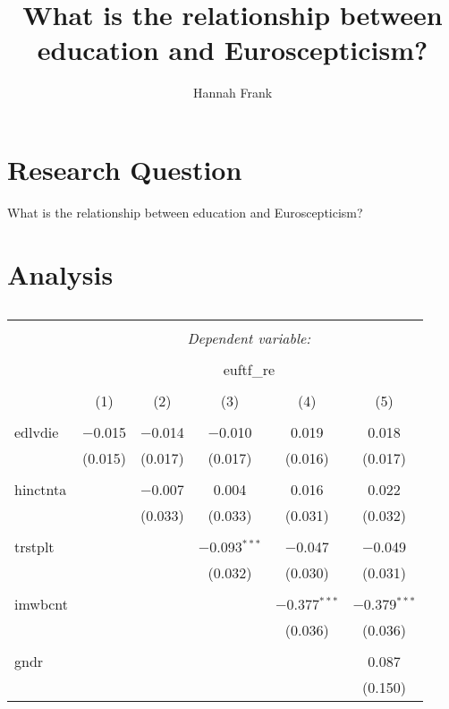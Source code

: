 \documentclass[12pt,a4paper]{article}
\author{Hannah Frank}
\title{What is the relationship between education and Euroscepticism?}
\begin{document}

\maketitle %
	
\section{Research Question} %
What is the relationship between education and Euroscepticism?


\section{Analysis}
\begin{table}[!htbp] \centering 
	\caption{} 
	\label{} 
	\begin{tabular}{@{\extracolsep{5pt}}lccccc} 
		\\[-1.8ex]\hline 
		\hline \\[-1.8ex] 
		& \multicolumn{5}{c}{\textit{Dependent variable:}} \\ 
		\cline{2-6} 
		\\[-1.8ex] & \multicolumn{5}{c}{euftf\_re} \\ 
		\\[-1.8ex] & (1) & (2) & (3) & (4) & (5)\\ 
		\hline \\[-1.8ex] 
		edlvdie & $-$0.015 & $-$0.014 & $-$0.010 & 0.019 & 0.018 \\ 
		& (0.015) & (0.017) & (0.017) & (0.016) & (0.017) \\ 
		& & & & & \\ 
		hinctnta &  & $-$0.007 & 0.004 & 0.016 & 0.022 \\ 
		&  & (0.033) & (0.033) & (0.031) & (0.032) \\ 
		& & & & & \\ 
		trstplt &  &  & $-$0.093$^{***}$ & $-$0.047 & $-$0.049 \\ 
		&  &  & (0.032) & (0.030) & (0.031) \\ 
		& & & & & \\ 
		imwbcnt &  &  &  & $-$0.377$^{***}$ & $-$0.379$^{***}$ \\ 
		&  &  &  & (0.036) & (0.036) \\ 
		& & & & & \\ 
		gndr &  &  &  &  & 0.087 \\ 
		&  &  &  &  & (0.150) \\ 

\end{tabular}
\end{table}
\end{document}
